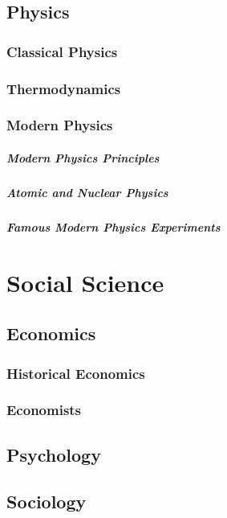 \documentclass[12pt]{book}
\begin{document}
	\section{Physics}
		\subsection{Classical Physics}
		\subsection{Thermodynamics}
		\subsection{Modern Physics}
			\paragraph{Modern Physics Principles}
			\paragraph{Atomic and Nuclear Physics}
			\paragraph{Famous Modern Physics Experiments}


\chapter{Social Science}
	\section{Economics}
		\subsection{Historical Economics}
		\subsection{Economists}

	\section{Psychology}
	\section{Sociology}
\end{document}
